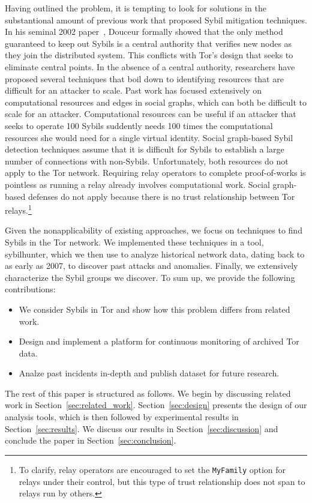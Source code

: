 Having outlined the problem, it is tempting to look for solutions in the
substantional amount of previous work that proposed Sybil mitigation
techniques.  In his seminal 2002 paper~\cite{Douceur2002a}, Douceur formally
showed that the only method guaranteed to keep out Sybils is a central
authority that verifies new nodes as they join the distributed system.  This
conflicts with Tor's design that seeks to eliminate central points.  In the
absence of a central authority, researchers have proposed several techniques
that boil down to identifying resources that are difficult for an attacker to
scale.  Past work has focused extensively on computational resources and edges
in social graphs, which can both be difficult to scale for an attacker.
Computational resources can be useful if an attacker that seeks to operate 100
Sybils suddently needs 100 times the computational resources she would need for
a single virtual identity.  Social graph-based Sybil detection techniques
assume that it is difficult for Sybils to establish a large number of
connections with non-Sybils.  Unfortunately, both resources do not apply to the
Tor network. Requiring relay operators to complete proof-of-works is pointless
as running a relay already involves computational work.  Social graph-based
defenses do not apply because there is no trust relationship between Tor
relays.\footnote{To clarify, relay operators are encouraged to set the
\texttt{MyFamily} option for relays under their control, but this type of
trust relationship does not span to relays run by others.}

Given the nonapplicability of existing approaches, we focus on techniques to
find Sybils in the Tor network.  We implemented these techniques in a tool,
sybilhunter, which we then use to analyze historical network data, dating back
to as early as 2007, to discover past attacks and anomalies.  Finally, we
extensively characterize the Sybil groups we discover.  To sum up, we provide
the following contributions:
\begin{itemize}
	\item We consider Sybils in Tor and show how this problem differs from
		related work.
	\item Design and implement a platform for continuous monitoring of archived
		Tor data.
	\item Analze past incidents in-depth and publish dataset for future
		research.
\end{itemize}

The rest of this paper is structured as follows.  We begin by discussing
related work in Section~\ref{sec:related_work}.  Section~\ref{sec:design}
presents the design of our analysis tools, which is then followed by
experimental results in Section~\ref{sec:results}.  We discuss our results in
Section~\ref{sec:discussion} and conclude the paper in
Section~\ref{sec:conclusion}.
